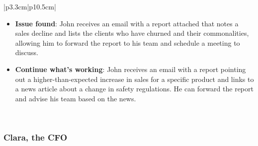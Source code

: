 \documentclass[a4paper]{report}
\begin{document}
\begin{tabular}{|p{3.3cm}|p{10.5cm}|}
\begin{minipage}[t]{\linewidth}
\begin{itemize}
        \item \textbf{Issue found}: John receives an email with a report attached that notes a sales decline and lists the clients who have churned and their commonalities, allowing him to forward the report to his team and schedule a meeting to discuss.
        \item \textbf{Continue what's working}: John receives an email with a report pointing out a higher-than-expected increase in sales for a specific product and links to a news article about a change in safety regulations. He can forward the report and advise his team based on the news.
    \end{itemize}
    \vspace{0.05em}
\end{minipage} \\
\hline
\end{tabular}


\subsubsection{Clara, the CFO}
\end{document}
